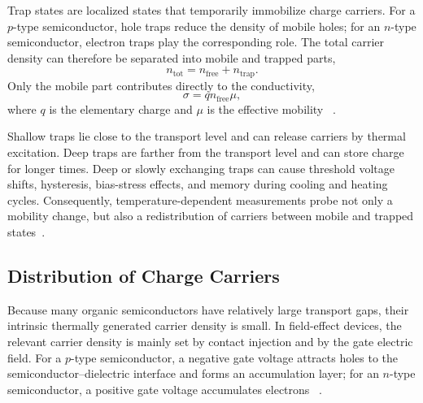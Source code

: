 Trap states are localized states that temporarily immobilize charge carriers. For
a $p$-type semiconductor, hole traps reduce the density of mobile holes; for an
$n$-type semiconductor, electron traps play the corresponding role. The total
carrier density can therefore be separated into mobile and trapped parts,
\begin{equation}
    n_\mathrm{tot} = n_\mathrm{free} + n_\mathrm{trap} .
\end{equation}
Only the mobile part contributes directly to the conductivity,
\begin{equation}
    \sigma = q n_\mathrm{free}\mu ,
\end{equation}
where $q$ is the elementary charge and $\mu$ is the effective mobility
~\cite{Bruetting2005,Hirwa2015TrapStates}.

Shallow traps lie close to the transport level and can release carriers by
thermal excitation. Deep traps are farther from the transport level and can store
charge for longer times. Deep or slowly exchanging traps can cause threshold
voltage shifts, hysteresis, bias-stress effects, and memory during cooling and
heating cycles. Consequently, temperature-dependent measurements probe not only a
mobility change, but also a redistribution of carriers between mobile and trapped
states~\cite{Hirwa2015TrapStates,Bobbert2012OperationalStability}.

 \subsection{Distribution of Charge Carriers}
\label{subsec:charge_carrier_distribution}

Because many organic semiconductors have relatively large transport gaps, their
intrinsic thermally generated carrier density is small. In field-effect devices,
the relevant carrier density is mainly set by contact injection and by the gate
electric field. For a $p$-type semiconductor, a negative gate voltage attracts
holes to the semiconductor--dielectric interface and forms an accumulation layer;
for an $n$-type semiconductor, a positive gate voltage accumulates electrons
~\cite{Sirringhaus2005DevicePhysics,Bruetting2005}.

